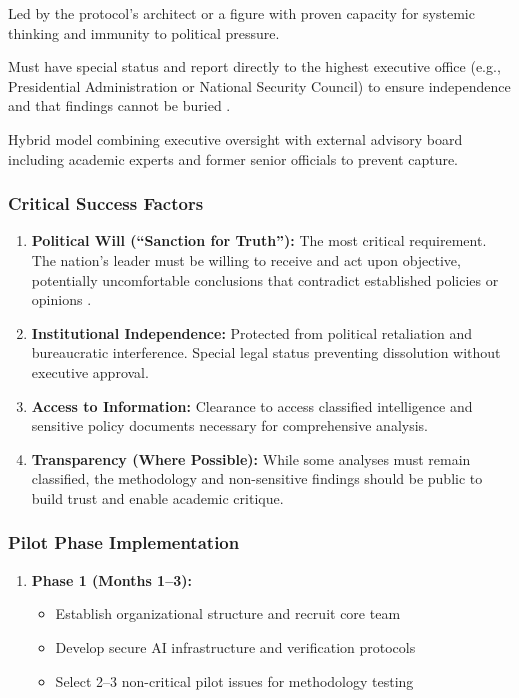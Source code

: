 \documentclass[11pt,a4paper]{article}
\begin{document}
\begin{small}
\begin{description}[style=nextline]
    \item[\textbf{Leadership}] Led by the protocol's architect or a figure with proven capacity for systemic thinking and immunity to political pressure.
    
    \item[\textbf{Reporting Structure}] Must have special status and report directly to the highest executive office (e.g., Presidential Administration or National Security Council) to ensure independence and that findings cannot be buried \citep[lines 775--776, 1036--1037, 1178--1180]{AnalyticalReport2025}.
    
    \item[\textbf{Governance}] Hybrid model combining executive oversight with external advisory board including academic experts and former senior officials to prevent capture.
\end{description}

\subsubsection{Critical Success Factors}
\begin{enumerate}[nosep]
    \item \textbf{Political Will (``Sanction for Truth''):} The most critical requirement. The nation's leader must be willing to receive and act upon objective, potentially uncomfortable conclusions that contradict established policies or opinions \citep[lines 1180, 1224--1225]{AnalyticalReport2025}.
    
    \item \textbf{Institutional Independence:} Protected from political retaliation and bureaucratic interference. Special legal status preventing dissolution without executive approval.
    
    \item \textbf{Access to Information:} Clearance to access classified intelligence and sensitive policy documents necessary for comprehensive analysis.
    
    \item \textbf{Transparency (Where Possible):} While some analyses must remain classified, the methodology and non-sensitive findings should be public to build trust and enable academic critique.
\end{enumerate}

\subsubsection{Pilot Phase Implementation}
\begin{enumerate}
    \item \textbf{Phase 1 (Months 1--3):} 
    \begin{itemize}[nosep]
        \item Establish organizational structure and recruit core team
        \item Develop secure AI infrastructure and verification protocols
        \item Select 2--3 non-critical pilot issues for methodology testing
    \end{itemize}
    

\end{enumerate}
\end{small}
\end{document}
